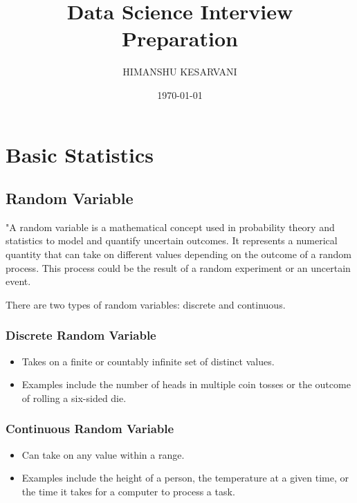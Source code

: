 \documentclass[12pt]{book}
\begin{document}
\frontmatter
\title{Data Science Interview Preparation}
\author{HIMANSHU KESARVANI}
\date{\today}
\maketitle

\tableofcontents
\listoffigures

\mainmatter


\chapter{Basic Statistics}

\section{Random Variable}

"A random variable is a mathematical concept used in probability theory and statistics to model and quantify uncertain outcomes. It represents a numerical quantity that can take on different values depending on the outcome of a random process. This process could be the result of a random experiment or an uncertain event.

There are two types of random variables: discrete and continuous. 

\subsection{Discrete Random Variable}
    \begin{itemize}
        \item Takes on a finite or countably infinite set of distinct values.
        \item Examples include the number of heads in multiple coin tosses or the outcome of rolling a six-sided die.
    \end{itemize}

\subsection{Continuous Random Variable}
    \begin{itemize}
        \item Can take on any value within a range.
        \item Examples include the height of a person, the temperature at a given time, or the time it takes for a computer to process a task.
    \end{itemize}
\end{document}
